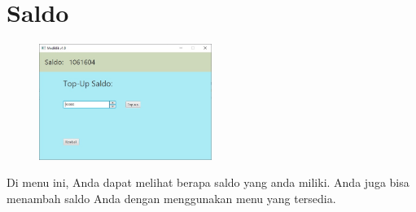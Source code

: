 \documentclass[a4paper]{article}
\begin{document}
\section{Saldo}
\begin{figure}[H]
	\centering
	\includegraphics[width=0.5\textwidth]{imgs/mediklik_6.jpg}
\end{figure}
\par Di menu ini, Anda dapat melihat berapa saldo yang anda miliki. Anda juga bisa menambah saldo Anda dengan menggunakan menu yang tersedia.
\end{document}

